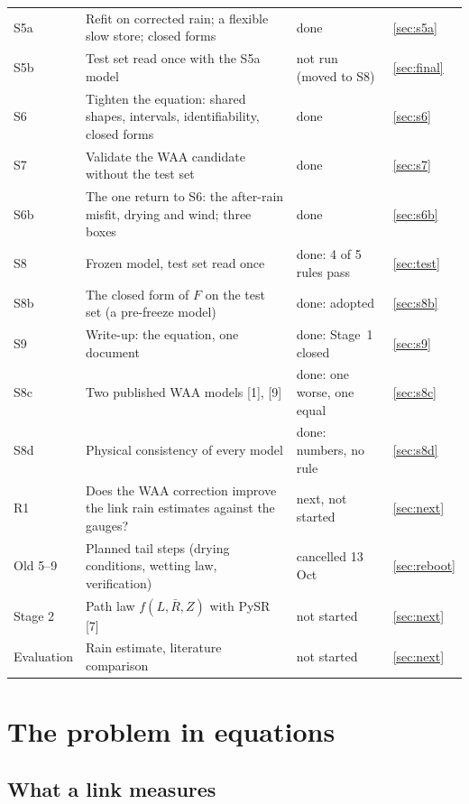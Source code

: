 \documentclass[11pt,a4paper]{article}
\newcommand{\Rbar}{\bar{R}}
\begin{document}
\begin{table}[H]
\begin{tabularx}{\linewidth}{@{}l Y l l@{}}
S5a & Refit on corrected rain; a flexible slow store; closed forms & done & \ref{sec:s5a} \\
S5b & Test set read once with the S5a model & not run (moved to S8) & \ref{sec:final} \\
S6 & Tighten the equation: shared shapes, intervals, identifiability, closed forms & done & \ref{sec:s6} \\
S7 & Validate the WAA candidate without the test set & done & \ref{sec:s7} \\
S6b & The one return to S6: the after-rain misfit, drying and wind; three boxes & done & \ref{sec:s6b} \\
S8 & Frozen model, test set read once & done: 4 of 5 rules pass & \ref{sec:test} \\
S8b & The closed form of $F$ on the test set (a pre-freeze model) & done: adopted & \ref{sec:s8b} \\
S9 & Write-up: the equation, one document & done: Stage~1 closed & \ref{sec:s9} \\
S8c & Two published WAA models [1], [9] & done: one worse, one equal & \ref{sec:s8c} \\
S8d & Physical consistency of every model & done: numbers, no rule & \ref{sec:s8d} \\
R1 & Does the WAA correction improve the link rain estimates against the gauges? & next, not started & \ref{sec:next} \\
Old 5--9 & Planned tail steps (drying conditions, wetting law, verification) & cancelled 13 Oct & \ref{sec:reboot} \\
Stage 2 & Path law $f(L,\Rbar,Z)$ with PySR [7] & not started & \ref{sec:next} \\
Evaluation & Rain estimate, literature comparison & not started & \ref{sec:next} \\
\bottomrule
\end{tabularx}
\end{table}

\section{The problem in equations}
\label{sec:problem}

\subsection{What a link measures}
\end{document}
